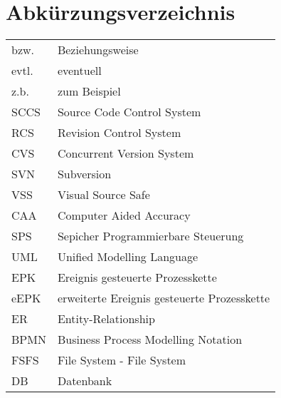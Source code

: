\chapter*{Abkürzungsverzeichnis}
\begin{tabular}{ll}
bzw. & Beziehungsweise \\
evtl. & eventuell \\ 
z.b. & zum Beispiel \\
SCCS & Source Code Control System \\ 
RCS & Revision Control System \\ 
CVS & Concurrent Version System \\
SVN & Subversion \\
VSS & Visual Source Safe \\
CAA & Computer Aided Accuracy \\
SPS & Sepicher Programmierbare Steuerung \\
UML & Unified Modelling Language \\
EPK & Ereignis gesteuerte Prozesskette \\
eEPK & erweiterte Ereignis gesteuerte Prozesskette \\
ER & Entity-Relationship \\
BPMN & Business Process Modelling Notation \\
FSFS & File System - File System \\
DB & Datenbank \\
\end{tabular} 